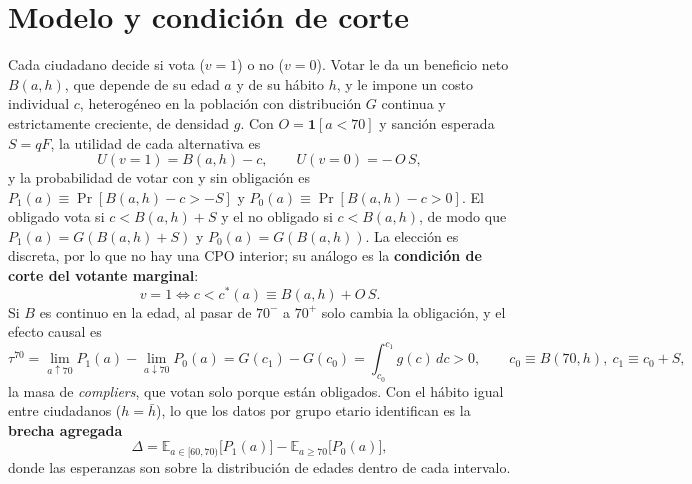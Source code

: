 \documentclass[11pt]{article}
\begin{document}
\section{Modelo y condición de corte}
Cada ciudadano decide si vota ($v=1$) o no ($v=0$). Votar le da un beneficio neto $B(a,h)$, que depende de su edad $a$ y de su hábito $h$, y le impone un costo individual $c$, heterogéneo en la población con distribución $G$ continua y estrictamente creciente, de densidad $g$. Con $O=\mathbf{1}[a<70]$ y sanción esperada $S=qF$, la utilidad de cada alternativa es
\[
U(v=1)=B(a,h)-c,\qquad U(v=0)=-\,O\,S ,
\]
y la probabilidad de votar con y sin obligación es $P_1(a)\equiv\Pr[B(a,h)-c>-S]$ y $P_0(a)\equiv\Pr[B(a,h)-c>0]$. El obligado vota si $c<B(a,h)+S$ y el no obligado si $c<B(a,h)$, de modo que $P_1(a)=G(B(a,h)+S)$ y $P_0(a)=G(B(a,h))$. La elección es discreta, por lo que no hay una CPO interior; su análogo es la \textbf{condición de corte del votante marginal}:
\begin{equation}
v=1 \iff c< c^*(a)\equiv B(a,h)+O\,S .
\end{equation}
Si $B$ es continuo en la edad, al pasar de $70^-$ a $70^+$ solo cambia la obligación, y el efecto causal es
\begin{equation}
\tau^{70}=\lim_{a\uparrow 70}P_1(a)-\lim_{a\downarrow 70}P_0(a)=G(c_1)-G(c_0)=\int_{c_0}^{c_1}g(c)\,dc>0,\qquad c_0\equiv B(70,h),\ c_1\equiv c_0+S,
\end{equation}
la masa de \emph{compliers}, que votan solo porque están obligados. Con el hábito igual entre ciudadanos ($h=\bar h$), lo que los datos por grupo etario identifican es la \textbf{brecha agregada}
\begin{equation}
\Delta=\mathbb E_{a\in[60,70)}\big[P_1(a)\big]-\mathbb E_{a\ge 70}\big[P_0(a)\big],
\end{equation}
donde las esperanzas son sobre la distribución de edades dentro de cada intervalo.
\end{document}
